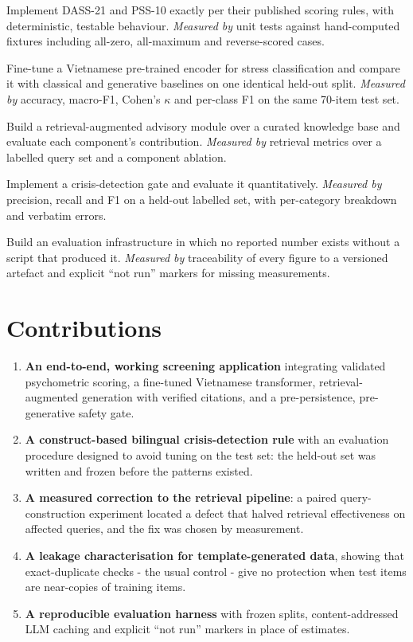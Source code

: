 \begin{description}[style=nextline, leftmargin=1.2cm]
	\item[O1 - Psychometric scoring.] Implement DASS-21 and PSS-10 exactly per their published scoring rules, with deterministic, testable behaviour. \textit{Measured by} unit tests against hand-computed fixtures including all-zero, all-maximum and reverse-scored cases.
	\item[O2 - Text classification.] Fine-tune a Vietnamese pre-trained encoder for stress classification and compare it with classical and generative baselines on one identical held-out split. \textit{Measured by} accuracy, macro-F1, Cohen's $\kappa$ and per-class F1 on the same 70-item test set.
	\item[O3 - Grounded advice.] Build a retrieval-augmented advisory module over a curated knowledge base and evaluate each component's contribution. \textit{Measured by} retrieval metrics over a labelled query set and a component ablation.
	\item[O4 - Safety.] Implement a crisis-detection gate and evaluate it quantitatively. \textit{Measured by} precision, recall and F1 on a held-out labelled set, with per-category breakdown and verbatim errors.
	\item[O5 - Reproducibility.] Build an evaluation infrastructure in which no reported number exists without a script that produced it. \textit{Measured by} traceability of every figure to a versioned artefact and explicit ``not run'' markers for missing measurements.
\end{description}

\section{Contributions}
\begin{enumerate}
	\item \textbf{An end-to-end, working screening application} integrating validated psychometric scoring, a fine-tuned Vietnamese transformer, retrieval-augmented generation with verified citations, and a pre-persistence, pre-generative safety gate.
	\item \textbf{A construct-based bilingual crisis-detection rule} with an evaluation procedure designed to avoid tuning on the test set: the held-out set was written and frozen before the patterns existed.
	\item \textbf{A measured correction to the retrieval pipeline}: a paired query-construction experiment located a defect that halved retrieval effectiveness on affected queries, and the fix was chosen by measurement.
	\item \textbf{A leakage characterisation for template-generated data}, showing that exact-duplicate checks - the usual control - give no protection when test items are near-copies of training items.
	\item \textbf{A reproducible evaluation harness} with frozen splits, content-addressed LLM caching and explicit ``not run'' markers in place of estimates.
\end{enumerate}


